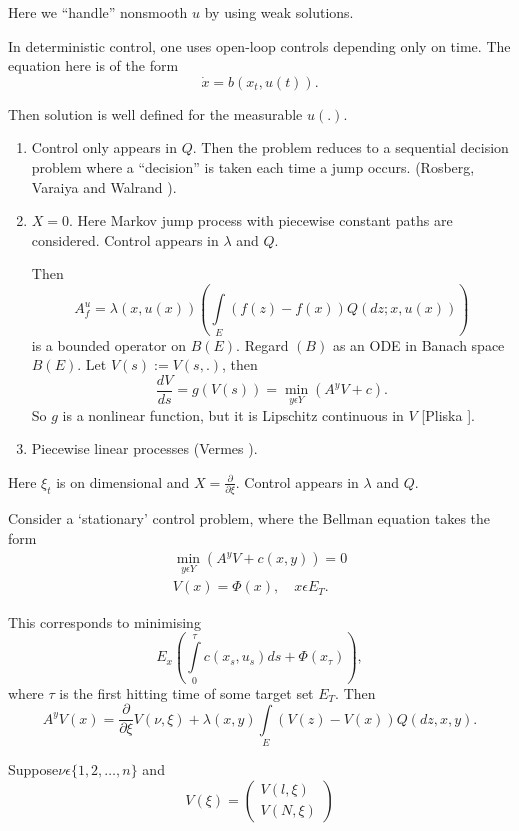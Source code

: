 Here we ``handle'' nonsmooth $u$ by using weak solutions.

\begin{rem}%
  In deterministic control, one uses open-loop controls depending only
  on time. The equation here is of the form 
  $$
  \dot{x} = b(x_t,u(t)).
  $$
\end{rem}

Then solution is well defined for the measurable $u(.)$.

\medskip
{}\pageoriginale
\begin{enumerate}
\renewcommand{\labelenumi}{(\theenumi)}
\item Control only appears in $Q$. Then the problem reduces to a
  sequential decision problem where a ``decision'' is taken each time
  a jump occurs. (Rosberg, Varaiya and Walrand \cite{key22}).

\item $X=0$. Here Markov jump process with piecewise constant paths
  are considered. Control appears in $\lambda$ and $Q$.

  Then 
  $$
  A^u_f = \lambda (x, u(x))\left(\int\limits_E(f(z)-f(x))Q (dz; x,
  u(x))\right)  
  $$
  is a bounded operator on $B(E)$. Regard $(B)$ as an ODE in Banach
  space $B(E)$. Let $V(s):= V(s,.)$, then
  $$
  \frac{dV}{ds}= g(V(s)) = \min_{y \epsilon Y} (A^y V+ c).
  $$
  So $g$ is a nonlinear function, but it is Lipschitz continuous in $V$
  [Pliska \cite{key21}].

\item Piecewise linear processes (Vermes \cite{key25}).
\end{enumerate}

Here $\xi_t$ is on dimensional and $X=\frac{\partial}{\partial
  \xi}$. Control appears in $\lambda$ and $Q$.

Consider a `stationary' control problem, where the Bellman equation
takes the form
\begin{gather*}
  \min_{y \epsilon Y} (A^y V + c(x, y))=0\\
  V(x) = \Phi (x), \quad x \epsilon E_T.
\end{gather*}

This corresponds to minimising
$$
E_x \left( \int\limits_0^\tau c(x_s, u_s) ds + \Phi (x_\tau)\right),
$$
where $\tau$ is the first hitting time of some target set $E_T$. Then
$$
A^y V(x) = \frac{\partial}{\partial \xi} V(\nu, \xi)+ \lambda(x, y)
\int\limits_E (V(z)- V(x)) Q (dz, x, y).
$$

Suppose\pageoriginale $\nu \epsilon \{ 1, 2, \ldots, n\}$ and 
$$
V(\xi)=
\begin{pmatrix}
  V(l, \xi)\\
  V(N, \xi)
\end{pmatrix}
$$

